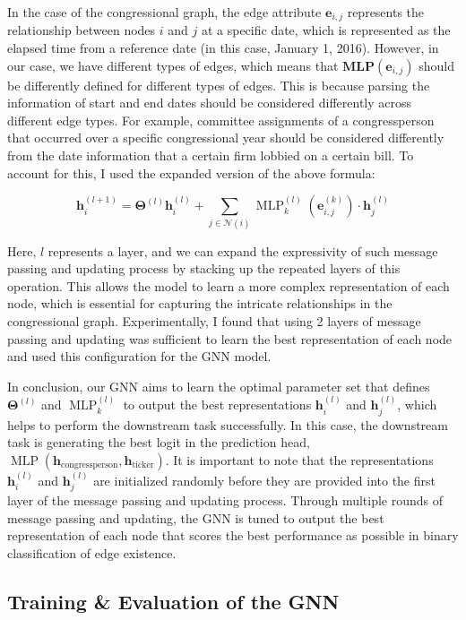 \documentclass[15pt,letterpaper]{article}
\begin{document}
In the case of the congressional graph, the edge attribute $\mathbf{e}_{i,j}$ represents the relationship between nodes $i$ and $j$ at a specific date, which is represented as the elapsed time from a reference date (in this case, January 1, 2016). 
However, in our case, we have different types of edges, which means that $\mathbf{MLP}\left(\mathbf{e}_{i, j}\right)$ should be differently defined for different types of edges. This is because parsing the information of start and end dates should be considered differently across different edge types. For example, committee assignments of a congressperson that occurred over a specific congressional year should be considered differently from the date information that a certain firm lobbied on a certain bill. To account for this, I used the expanded version of the above formula:

$$\mathbf{h}_i^{(l+1)}=\boldsymbol{\Theta}^{(l)} \mathbf{h}_i^{(l)}+\sum_{j \in \mathcal{N}(i)} \operatorname{MLP}^{(l)}_k\left(\mathbf{e}_{i, j}^{(k)}\right) \cdot \mathbf{h}_j^{(l)}$$

Here, $l$ represents a layer, and we can expand the expressivity of such message passing and updating process by stacking up the repeated layers of this operation. This allows the model to learn a more complex representation of each node, which is essential for capturing the intricate relationships in the congressional graph.
Experimentally, I found that using 2 layers of message passing and updating was sufficient to learn the best representation of each node and used this configuration for the GNN model.

In conclusion, our GNN aims to learn the optimal parameter set that defines $\boldsymbol{\Theta}^{(l)}$ and $\operatorname{MLP}_k^{(l)}$ to output the best representations $\mathbf{h}_i^{(l)}$ and $\mathbf{h}_j^{(l)}$, which helps to perform the downstream task successfully. In this case, the downstream task is generating the best logit in the prediction head, $\operatorname{MLP}(\mathbf{h}_{\text{congressperson}}, \mathbf{h}_{\text{ticker}})$. It is important to note that the representations $\mathbf{h}_i^{(l)}$ and $\mathbf{h}_j^{(l)}$ are initialized randomly before they are provided into the first layer of the message passing and updating process. Through multiple rounds of message passing and updating, the GNN is tuned to output the best representation of each node that scores the best performance as possible in binary classification of edge existence.

\subsection{Training \& Evaluation of the GNN}
\end{document}
